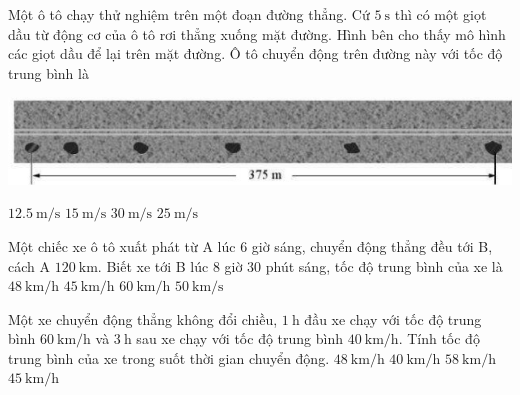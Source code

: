 \begin{ex}
	Một ô tô chạy thử nghiệm trên một đoạn đường thẳng. Cứ $\SI{5}{\second}$ thì có một giọt dầu từ động cơ của ô tô rơi thẳng xuống mặt đường. Hình bên cho thấy mô hình các giọt dầu để lại trên mặt đường. Ô tô chuyển động trên đường này với tốc độ trung bình là
	\begin{center}
		\includegraphics[scale=0.7]{figs/G10Y25B3-15}
	\end{center}
	\choice
	{$\SI{12.5}{\meter/\second}$}
	{\True $\SI{15}{\meter/\second}$}
	{$\SI{30}{\meter/\second}$}
	{$\SI{25}{\meter/\second}$}
\end{ex}

\begin{ex}
	Một chiếc xe ô tô xuất phát từ A lúc 6 giờ sáng, chuyển động thẳng đều tới B, cách A $\SI{120}{\kilo\meter}$. Biết xe tới B lúc 8 giờ 30 phút sáng, tốc độ trung bình của xe là 
	\choice
	{\True $\SI{48}{\kilo\meter/\hour}$}
	{$\SI{45}{\kilo\meter/\hour}$}
	{$\SI{60}{\kilo\meter/\hour}$}
	{$\SI{50}{\kilo\meter/\second}$}
\end{ex}

\begin{ex}
	Một xe chuyển động thẳng không đổi chiều, $\SI{1}{\hour}$ đầu xe chạy với tốc độ trung bình $\SI{60}{\kilo\meter/\hour}$ và $\SI{3}{\hour}$ sau xe chạy với tốc độ trung bình $\SI{40}{\kilo\meter/\hour}$. Tính tốc độ trung bình của xe trong suốt thời gian chuyển động.
	\choice
	{$\SI{48}{\kilo\meter/\hour}$}
	{$\SI{40}{\kilo\meter/\hour}$}
	{$\SI{58}{\kilo\meter/\hour}$}
	{\True $\SI{45}{\kilo\meter/\hour}$}
\end{ex}

